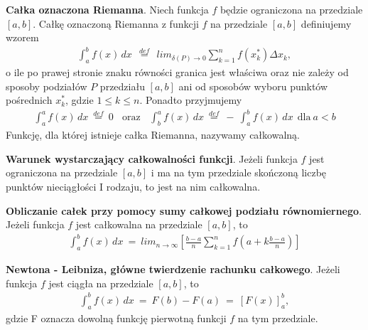 \documentclass[12pt]{article}
\begin{document}
    \begin{definition}
        \textbf{Całka oznaczona Riemanna}. Niech funkcja $f$ będzie ograniczona na przedziale $[a,b]$. Całkę oznaczoną
        Riemanna z funkcji  $f$  na przedziale $[a,b]$ definiujemy wzorem
        \begin{align*}
            \int_{a}^{b} f(x) \,dx ~~ \stackrel{def}{=} ~~ lim_{\delta(P)  \rightarrow 0} \sum_{k=1}^{n} f(x^{*}_k) \Delta x_k,
        \end{align*}
        o ile po prawej stronie znaku równości granica jest właściwa oraz nie zależy od sposoby podziałów $P$ przedziału
        $[a,b]$ ani od sposobów wyboru punktów pośrednich $x^{*}_k$, gdzie $1 \leq k \leq n$. Ponadto przyjmujemy
        \begin{align*}
            \int_a^a f(x)\,dx ~ \stackrel{def}{=} ~ 0 ~~~~ \text{oraz} ~~~~ \int_b^a f(x)\,dx ~ \stackrel{def}{=} ~ - ~ \int_a^b f(x) \,dx ~~ \text{dla} ~ a < b
        \end{align*}
        Funkcję, dla której istnieje całka Riemanna, nazywamy całkowalną.
    \end{definition}

    \begin{theorem}
        \textbf{Warunek wystarczający całkowalności funkcji}. Jeżeli funkcja $f$ jest ograniczona na przedziale $[a,b]$
        i ma na tym przedziale skończoną liczbę punktów nieciągłości I rodzaju, to jest na nim całkowalna.
    \end{theorem}

    \begin{theorem}
        \textbf{Obliczanie całek przy pomocy sumy całkowej podziału równomiernego}. Jeżeli funkcja $f$ jest całkowalna
        na przedziale $[a,b]$, to
        \begin{align*}
            \int_{a}^b f(x) \, dx ~ = ~ lim_{n \rightarrow \infty} [\frac{b - a}{n} \sum_{k=1}^n f (a + k \frac{b - a}{n})]
        \end{align*}
    \end{theorem}

    \begin{theorem}
        \textbf{Newtona - Leibniza, główne twierdzenie rachunku całkowego}. Jeżeli funkcja $f$ jest ciągła na przedziale
        $[a,b]$, to
        \begin{align*}
            \int_a^b f(x) \,dx ~ = ~ F(b) - F(a) ~ = ~ [F(x)]_a^b,
        \end{align*}
        gdzie F oznacza dowolną funkcję pierwotną funkcji $f$  na tym przedziale.
    \end{theorem}
\end{document}
